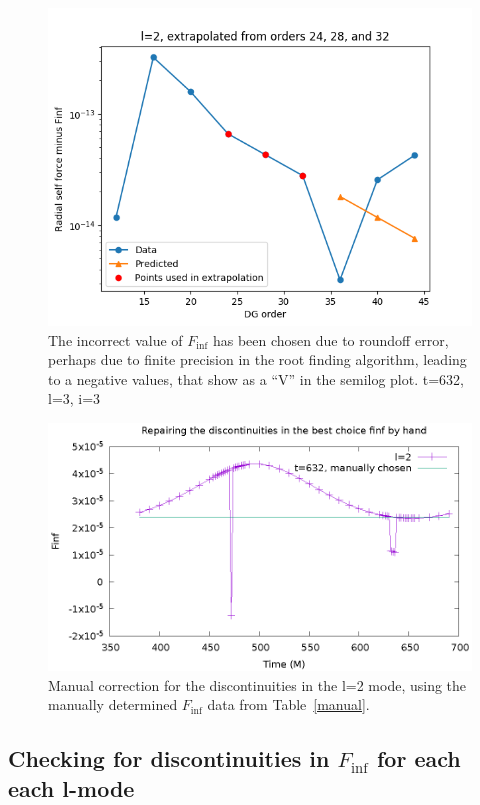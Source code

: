 \begin{figure}
  \includegraphics{extrapolate7t632l2i3}
  \caption{The incorrect value of $F_{\inf}$ has been chosen due to roundoff error, perhaps due to finite precision in the root finding algorithm, leading to a negative values, that show as a ``V'' in the semilog plot. t=632, l=3, i=3}
\end{figure}


\begin{figure}
  \includegraphics{bestFinfManuallyChosent632l2}
\caption{Manual correction for the discontinuities in the l=2 mode, using the manually determined $F_{\inf}$ data from Table~\ref{manual}. }
\end{figure}

\subsection{ Checking for discontinuities in $F_{\inf}$ for each each l-mode}

